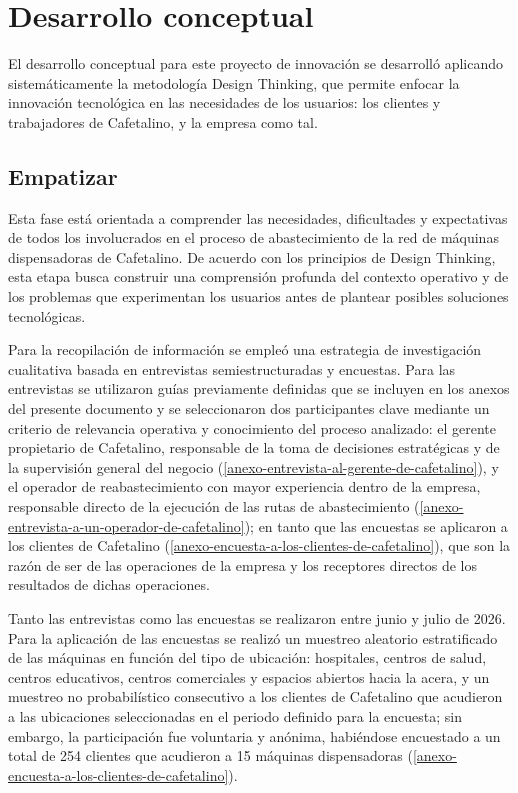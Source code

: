 \section{Desarrollo conceptual}\label{desarrollo-conceptual}

El desarrollo conceptual para este proyecto de innovación se desarrolló aplicando sistemáticamente la metodología Design Thinking, que permite enfocar la innovación tecnológica en las necesidades de los usuarios: los clientes y trabajadores de Cafetalino, y la empresa como tal.

\subsection{Empatizar}\label{empatizar}

Esta fase está orientada a comprender las necesidades, dificultades y expectativas de todos los involucrados en el proceso de abastecimiento de la red de máquinas dispensadoras de Cafetalino. De acuerdo con los principios de Design Thinking, esta etapa busca construir una comprensión profunda del contexto operativo y de los problemas que experimentan los usuarios antes de plantear posibles soluciones tecnológicas.

Para la recopilación de información se empleó una estrategia de investigación cualitativa basada en entrevistas semiestructuradas y encuestas. Para las entrevistas se utilizaron guías previamente definidas que se incluyen en los anexos del presente documento y se seleccionaron dos participantes clave mediante un criterio de relevancia operativa y conocimiento del proceso analizado: el gerente propietario de Cafetalino, responsable de la toma de decisiones estratégicas y de la supervisión general del negocio (\ref{anexo-entrevista-al-gerente-de-cafetalino}), y el operador de reabastecimiento con mayor experiencia dentro de la empresa, responsable directo de la ejecución de las rutas de abastecimiento (\ref{anexo-entrevista-a-un-operador-de-cafetalino}); en tanto que las encuestas se aplicaron a los clientes de Cafetalino (\ref{anexo-encuesta-a-los-clientes-de-cafetalino}), que son la razón de ser de las operaciones de la empresa y los receptores directos de los resultados de dichas operaciones.

Tanto las entrevistas como las encuestas se realizaron entre junio y julio de 2026. Para la aplicación de las encuestas se realizó un muestreo aleatorio estratificado de las máquinas en función del tipo de ubicación: hospitales, centros de salud, centros educativos, centros comerciales y espacios abiertos hacia la acera, y un muestreo no probabilístico consecutivo a los clientes de Cafetalino que acudieron a las ubicaciones seleccionadas en el periodo definido para la encuesta; sin embargo, la participación fue voluntaria y anónima, habiéndose encuestado a un total de 254 clientes que acudieron a 15 máquinas dispensadoras (\ref{anexo-encuesta-a-los-clientes-de-cafetalino}).

